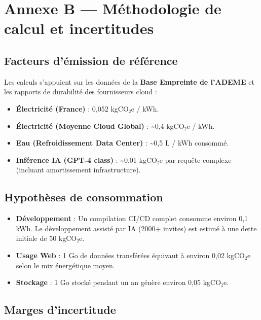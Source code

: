 \documentclass[
  10pt,
  a4paper,
  DIV=11,
  numbers=noendperiod,
  oneside]{scrreprt}
\providecommand{\tightlist}{%
  \setlength{\itemsep}{0pt}\setlength{\parskip}{0pt}}
\let\oldtextbf\textbf
\renewcommand{\textbf}[1]{\oldtextbf{\textcolor{cmmnavy}{#1}}}
\begin{document}
\section{Annexe B --- Méthodologie de calcul et
incertitudes}\label{annexe-b-methodologie-de-calcul-et-incertitudes}

\subsection{Facteurs d'émission de
référence}\label{facteurs-duxe9mission-de-ruxe9fuxe9rence}

Les calculs s'appuient sur les données de la \textbf{Base Empreinte de
l'ADEME} et les rapports de durabilité des fournisseurs cloud :

\begin{itemize}
\tightlist
\item
  \textbf{Électricité (France)} : 0,052 kgCO₂e / kWh.
\item
  \textbf{Électricité (Moyenne Cloud Global)} : \textasciitilde0,4
  kgCO₂e / kWh.
\item
  \textbf{Eau (Refroidissement Data Center)} : \textasciitilde0,5 L /
  kWh consommé.
\item
  \textbf{Inférence IA (GPT-4 class)} : \textasciitilde0,01 kgCO₂e par
  requête complexe (incluant amortissement infrastructure).
\end{itemize}

\subsection{Hypothèses de
consommation}\label{hypothuxe8ses-de-consommation}

\begin{itemize}
\tightlist
\item
  \textbf{Développement} : Un compilation CI/CD complet consomme environ
  0,1 kWh. Le développement assisté par IA (2000+ invites) est estimé à
  une dette initiale de 50 kgCO₂e.
\item
  \textbf{Usage Web} : 1 Go de données transférées équivaut à environ
  0,02 kgCO₂e selon le mix énergétique moyen.
\item
  \textbf{Stockage} : 1 Go stocké pendant un an génère environ 0,05
  kgCO₂e.
\end{itemize}

\subsection{Marges d'incertitude}\label{marges-dincertitude}
\end{document}
